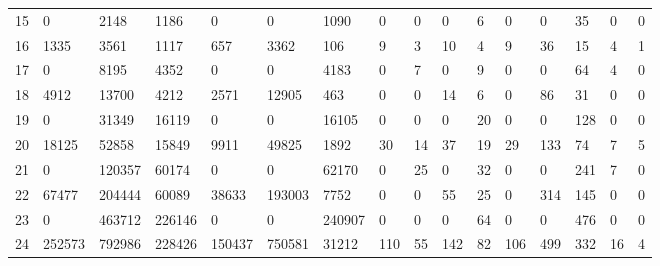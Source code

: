 \documentclass[a4paper,12pt]{article}
\begin{document}
\begin{landscape}
\begin{table}[]
\begin{tabular}{l|lllllllllllllll}
				15 &0 &2148 &1186 &0 &0 &1090 &0 &0 &0 &6 &0 &0 &35 &0 &0\\
				16 &1335 &3561 &1117 &657 &3362 &106 &9 &3 &10 &4 &9 &36 &15 &4 &1\\
				17 &0 &8195 &4352 &0 &0 &4183 &0 &7 &0 &9 &0 &0 &64 &4 &0\\
				18 &4912 &13700 &4212 &2571 &12905 &463 &0 &0 &14 &6 &0 &86 &31 &0 &0\\
				19 &0 &31349 &16119 &0 &0 &16105 &0 &0 &0 &20 &0 &0 &128 &0 &0\\
				20 &18125 &52858 &15849 &9911 &49825 &1892 &30 &14 &37 &19 &29 &133 &74 &7 &5\\
				21 &0 &120357 &60174 &0 &0 &62170 &0 &25 &0 &32 &0 &0 &241 &7 &0\\
				22 &67477 &204444 &60089 &38633 &193003 &7752 &0 &0 &55 &25 &0 &314 &145 &0 &0\\
				23 &0 &463712 &226146 &0 &0 &240907 &0 &0 &0 &64 &0 &0 &476 &0 &0\\
				24 &252573 &792986 &228426 &150437 &750581 &31212 &110 &55 &142 &82 &106 &499 &332 &16 &4\\
				\hline
			\end{tabular}%
		\end{table}
	\end{landscape}
	\restoregeometry
	
\end{document}
